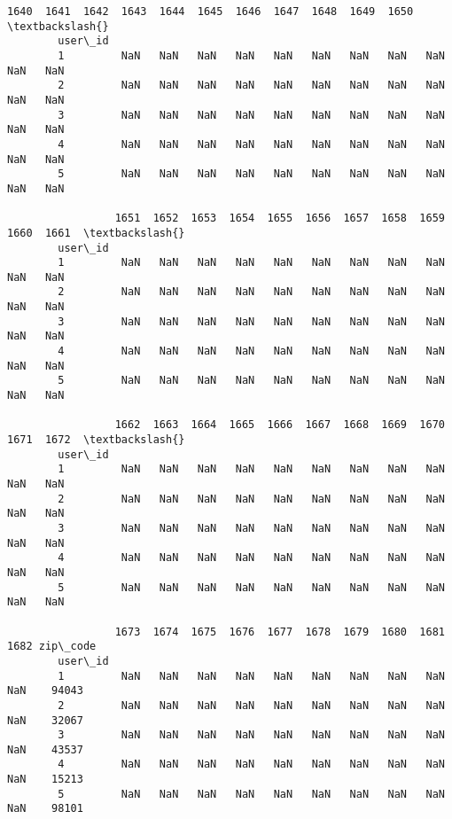 \documentclass[11pt]{article}
\begin{document}
\begin{Verbatim}[commandchars=\\\{\}]
                 1640  1641  1642  1643  1644  1645  1646  1647  1648  1649  1650  \textbackslash{}
        user\_id                                                                     
        1         NaN   NaN   NaN   NaN   NaN   NaN   NaN   NaN   NaN   NaN   NaN   
        2         NaN   NaN   NaN   NaN   NaN   NaN   NaN   NaN   NaN   NaN   NaN   
        3         NaN   NaN   NaN   NaN   NaN   NaN   NaN   NaN   NaN   NaN   NaN   
        4         NaN   NaN   NaN   NaN   NaN   NaN   NaN   NaN   NaN   NaN   NaN   
        5         NaN   NaN   NaN   NaN   NaN   NaN   NaN   NaN   NaN   NaN   NaN   
        
                 1651  1652  1653  1654  1655  1656  1657  1658  1659  1660  1661  \textbackslash{}
        user\_id                                                                     
        1         NaN   NaN   NaN   NaN   NaN   NaN   NaN   NaN   NaN   NaN   NaN   
        2         NaN   NaN   NaN   NaN   NaN   NaN   NaN   NaN   NaN   NaN   NaN   
        3         NaN   NaN   NaN   NaN   NaN   NaN   NaN   NaN   NaN   NaN   NaN   
        4         NaN   NaN   NaN   NaN   NaN   NaN   NaN   NaN   NaN   NaN   NaN   
        5         NaN   NaN   NaN   NaN   NaN   NaN   NaN   NaN   NaN   NaN   NaN   
        
                 1662  1663  1664  1665  1666  1667  1668  1669  1670  1671  1672  \textbackslash{}
        user\_id                                                                     
        1         NaN   NaN   NaN   NaN   NaN   NaN   NaN   NaN   NaN   NaN   NaN   
        2         NaN   NaN   NaN   NaN   NaN   NaN   NaN   NaN   NaN   NaN   NaN   
        3         NaN   NaN   NaN   NaN   NaN   NaN   NaN   NaN   NaN   NaN   NaN   
        4         NaN   NaN   NaN   NaN   NaN   NaN   NaN   NaN   NaN   NaN   NaN   
        5         NaN   NaN   NaN   NaN   NaN   NaN   NaN   NaN   NaN   NaN   NaN   
        
                 1673  1674  1675  1676  1677  1678  1679  1680  1681  1682 zip\_code  
        user\_id                                                                       
        1         NaN   NaN   NaN   NaN   NaN   NaN   NaN   NaN   NaN   NaN    94043  
        2         NaN   NaN   NaN   NaN   NaN   NaN   NaN   NaN   NaN   NaN    32067  
        3         NaN   NaN   NaN   NaN   NaN   NaN   NaN   NaN   NaN   NaN    43537  
        4         NaN   NaN   NaN   NaN   NaN   NaN   NaN   NaN   NaN   NaN    15213  
        5         NaN   NaN   NaN   NaN   NaN   NaN   NaN   NaN   NaN   NaN    98101  
\end{Verbatim}
            
\end{document}
